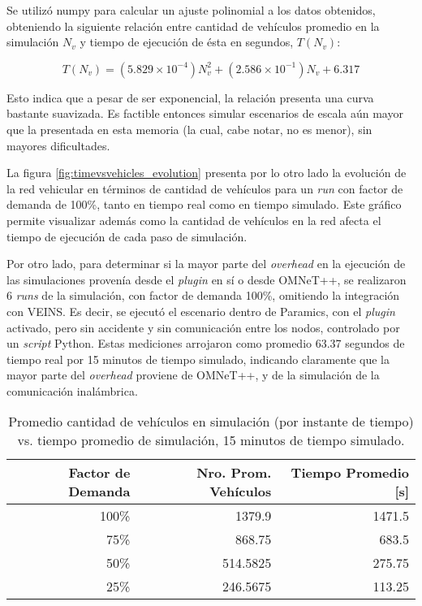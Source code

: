 Se utilizó numpy para calcular un ajuste polinomial a los datos obtenidos, obteniendo la siguiente relación entre cantidad de vehículos promedio en la simulación $N_{v}$ y tiempo de ejecución de ésta en segundos, $T(N_{v})$:

\[ T(N_{v}) = (5.829 \times 10^{-4})N_{v}^{2} + (2.586 \times 10^{-1})N_{v} + 6.317 \]

Esto indica que a pesar de ser exponencial, la relación presenta una curva bastante suavizada. Es factible entonces simular escenarios de escala aún mayor que la presentada en esta memoria (la cual, cabe notar, no es menor), sin mayores dificultades.

La figura \ref{fig:timevsvehicles_evolution} presenta por lo otro lado la evolución de la red vehicular en términos de cantidad de vehículos para un \emph{run} con factor de demanda de 100\%, tanto en tiempo real como en tiempo simulado. Este gráfico permite visualizar además como la cantidad de vehículos en la red afecta el tiempo de ejecución de cada paso de simulación.

Por otro lado, para determinar si la mayor parte del \emph{overhead} en la ejecución de las simulaciones provenía desde el \emph{plugin} en sí o desde OMNeT++, se realizaron 6 \emph{runs} de la simulación, con factor de demanda 100\%, omitiendo la integración con VEINS. Es decir, se ejecutó el escenario dentro de Paramics, con el \emph{plugin} activado, pero sin accidente y sin comunicación entre los nodos, controlado por un \emph{script} Python. Estas mediciones arrojaron como promedio 63.37 segundos de tiempo real por 15 minutos de tiempo simulado, indicando claramente que la mayor parte del \emph{overhead} proviene de OMNeT++, y de la simulación de la comunicación inalámbrica.

\begin{table}[tpb]
    \centering
    \begin{tabular}{@{}rrr@{}}
        \textbf{Factor de Demanda} & \textbf{Nro. Prom. Vehículos} & \textbf{Tiempo Promedio [s]} \\ \midrule
        100\%           & 1379.9          & 1471.5              \\ %
        75\%            & 868.75          & 683.5               \\ %
        50\%            & 514.5825        & 275.75              \\ %
        25\%            & 246.5675        & 113.25              \\ \bottomrule
    \end{tabular}
    \caption[Cantidad de vehículos vs. tiempo real de simulación]{Promedio cantidad de vehículos en simulación (por instante de tiempo) vs. tiempo promedio de simulación, 15 minutos de tiempo simulado.}
    \label{table:vehiclesvstime}
\end{table}

